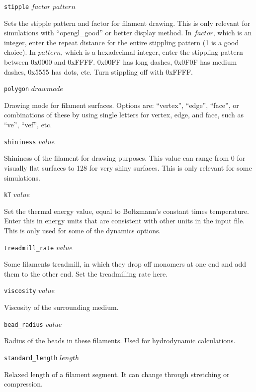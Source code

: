 \documentclass {scrbook}
\newcommand {\ttt} {\texttt}
\begin{document}
\begin{description}
\item{\ttt{stipple} $factor$ $pattern$}

Sets the stipple pattern and factor for filament drawing. This is only relevant for simulations with ``opengl\_good'' or better display method. In $factor$, which is an integer, enter the repeat distance for the entire stippling pattern (1 is a good choice). In $pattern$, which is a hexadecimal integer, enter the stippling pattern between 0x0000 and 0xFFFF. 0x00FF has long dashes, 0x0F0F has medium dashes, 0x5555 has dots, etc. Turn stippling off with 0xFFFF.

\item{\ttt{polygon} $drawmode$}

Drawing mode for filament surfaces. Options are: ``vertex'', ``edge'', ``face'', or combinations of these by using single letters for vertex, edge, and face, such as ``ve'', ``vef'', etc.

\item{\ttt{shininess} $value$}

Shininess of the filament for drawing purposes. This value can range from 0 for visually flat surfaces to 128 for very shiny surfaces. This is only relevant for some simulations.

\item{\ttt{kT} $value$}

Set the thermal energy value, equal to Boltzmann's constant times temperature. Enter this in energy units that are consistent with other units in the input file. This is only used for some of the dynamics options.

\item{\ttt{treadmill\_rate} $value$}

Some filaments treadmill, in which they drop off monomers at one end and add them to the other end. Set the treadmilling rate here.

\item{\ttt{viscosity} $value$}

Viscosity of the surrounding medium.

\item{\ttt{bead\_radius} $value$}

Radius of the beads in these filaments. Used for hydrodynamic calculations.

\item{\ttt{standard\_length} $length$}

Relaxed length of a filament segment. It can change through stretching or compression.


\end{description}
\end{document}
